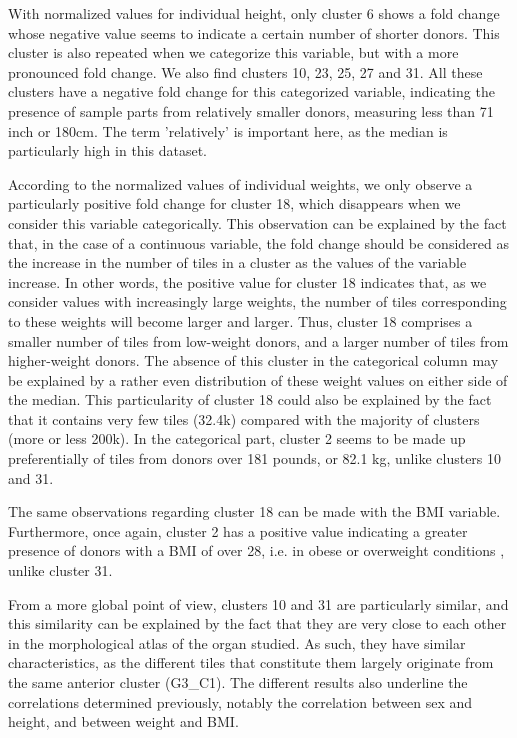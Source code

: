 \documentclass[a4paper, 11pt]{article}
\begin{document}
\begin{multicols}{2}
With normalized values for individual height, only cluster 6 shows a fold change whose negative value seems to indicate a certain number of shorter donors. This cluster is also repeated when we categorize this variable, but with a more pronounced fold change. We also find clusters 10, 23, 25, 27 and 31. All these clusters have a negative fold change for this categorized variable, indicating the presence of sample parts from relatively smaller donors, measuring less than 71 inch or 180cm. The term 'relatively' is important here, as the median is particularly high in this dataset.

According to the normalized values of individual weights, we only observe a particularly positive fold change for cluster 18, which disappears when we consider this variable categorically. This observation can be explained by the fact that, in the case of a continuous variable, the fold change should be considered as the increase in the number of tiles in a cluster as the values of the variable increase. In other words, the positive value for cluster 18 indicates that, as we consider values with increasingly large weights, the number of tiles corresponding to these weights will become larger and larger. Thus, cluster 18 comprises a smaller number of tiles from low-weight donors, and a larger number of tiles from higher-weight donors. The absence of this cluster in the categorical column may be explained by a rather even distribution of these weight values on either side of the median. This particularity of cluster 18 could also be explained by the fact that it contains very few tiles (32.4k) compared with the majority of clusters (more or less 200k). In the categorical part, cluster 2 seems to be made up preferentially of tiles from donors over 181 pounds, or 82.1 kg, unlike clusters 10 and 31.

The same observations regarding cluster 18 can be made with the BMI variable. Furthermore, once again, cluster 2 has a positive value indicating a greater presence of donors with a BMI of over 28, i.e. in obese or overweight conditions \citep{cdc_all_2022}, unlike cluster 31.

From a more global point of view, clusters 10 and 31 are particularly similar, and this similarity can be explained by the fact that they are very close to each other in the morphological atlas of the organ studied. As such, they have similar characteristics, as the different tiles that constitute them largely originate from the same anterior cluster (G3\_C1). The different results also underline the correlations determined previously, notably the correlation between sex and height, and between weight and BMI.


\end{multicols}
\end{document}
